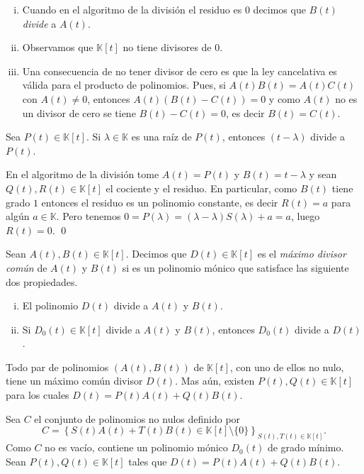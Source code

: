\begin{obs}
\begin{enumerate}[(i)]
  \item Cuando en el algoritmo de la división el residuo es $0$ decimos que $B(t)$ \emph{divide} a $A(t)$.
  \item Observamos que $\mathbb{K}[t]$ no tiene divisores de $0$.
  \item Una consecuencia de no tener divisor de cero es que la ley cancelativa es válida para el producto de polinomios. Pues, si $A(t)B(t)=A(t)C(t)$ con $A(t)\ne 0$, entonces $A(t)\left(B(t)-C(t)\right)=0$ y como $A(t)$ no es un divisor de cero se tiene $B(t)-C(t)=0$, es decir $B(t)=C(t)$. 
\end{enumerate}
\end{obs}

\begin{coro}
Sea $P(t)\in \mathbb{K}[t]$. Si $\lambda\in \mathbb{K}$ es una raíz de $P(t)$, entonces $(t-\lambda)$ divide a $P(t)$.
\end{coro}

\dem En el algoritmo de la división tome $A(t)=P(t)$ y $B(t)=t-\lambda$ y sean $Q(t),R(t)\in \mathbb{K}[t]$ el cociente y el residuo. En particular, como $B(t)$ tiene grado $1$ entonces el residuo es un polinomio constante, es decir $R(t)=a$ para algún $a\in \mathbb{K}$. Pero tenemos $0=P(\lambda)=(\lambda-\lambda)S(\lambda)+a=a$, luego $R(t)=0$. \qed

\begin{defn}
Sean $A(t),B(t)\in \mathbb{K}[t]$. Decimos que $D(t)\in \mathbb{K}[t]$ es el \emph{máximo divisor común} de $A(t)$ y $B(t)$ si es un polinomio mónico que satisface las siguiente dos propiedades.
\begin{enumerate}[(i)]
\item El polinomio $D(t)$ divide a $A(t)$ y $B(t)$.
\item Si $D_0(t)\in \mathbb{K}[t]$ divide a $A(t)$ y $B(t)$, entonces $D_0(t)$ divide a $D(t)$. 
\end{enumerate}
\end{defn}

\begin{prop}
Todo par de polinomios $(A(t),B(t))$ de $\mathbb{K}[t]$, con uno de ellos no nulo, tiene un máximo común divisor $D(t)$. Mas aún, existen $P(t),Q(t)\in \mathbb{K}[t]$ para los cuales $D(t)=P(t)A(t)+Q(t)B(t)$.
\end{prop}

\dem Sea $C$ el conjunto de polinomios no nulos definido por 
$$C=\left\{S(t)A(t)+T(t)B(t)\in \mathbb{K}[t]\setminus\{0\}\right\}_{S(t),T(t)\in \mathbb{K}[t]}.$$
Como $C$ no es vacío, contiene un polinomio mónico $D_0(t)$ de grado mínimo. Sean $P(t),Q(t)\in \mathbb{K}[t]$ tales que $D(t)=P(t)A(t)+Q(t)B(t)$.

